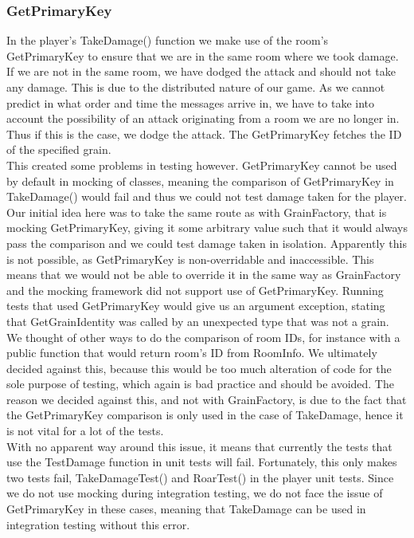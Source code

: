 \subsubsection{GetPrimaryKey} \label{getPrimaryKey}
In the player's TakeDamage() function we make use of the room's GetPrimaryKey to ensure that we are in the same room where we took damage. If we are not in the same room, we have dodged the attack and should not take any damage. This is due to the distributed nature of our game. As we cannot predict in what order and time the messages arrive in, we have to take into account the possibility of an attack originating from a room we are no longer in. Thus if this is the case, we dodge the attack. The GetPrimaryKey fetches the ID of the specified grain. \\
This created some problems in testing however. GetPrimaryKey cannot be used by default in mocking of classes, meaning the comparison of GetPrimaryKey in TakeDamage() would fail and thus we could not test damage taken for the player. \\
Our initial idea here was to take the same route as with GrainFactory, that is mocking GetPrimaryKey, giving it some arbitrary value such that it would always pass the comparison and we could test damage taken in isolation. Apparently this is not possible, as GetPrimaryKey is non-overridable and inaccessible. This means that we would not be able to override it in the same way as GrainFactory and the mocking framework did not support use of GetPrimaryKey. Running tests that used GetPrimaryKey would give us an argument exception, stating that GetGrainIdentity was called by an unexpected type that was not a grain. We thought of other ways to do the comparison of room IDs, for instance with a public function that would return room's ID from RoomInfo. We ultimately decided against this, because this would be too much alteration of code for the sole purpose of testing, which again is bad practice and should be avoided. The reason we decided against this, and not with GrainFactory, is due to the fact that the GetPrimaryKey comparison is only used in the case of TakeDamage, hence it is not vital for a lot of the tests. \\
With no apparent way around this issue, it means that currently the tests that use the TestDamage function in unit tests will fail. Fortunately, this only makes two tests fail, TakeDamageTest() and RoarTest() in the player unit tests. Since we do not use mocking during integration testing, we do not face the issue of GetPrimaryKey in these cases, meaning that TakeDamage can be used in integration testing without this error. 
